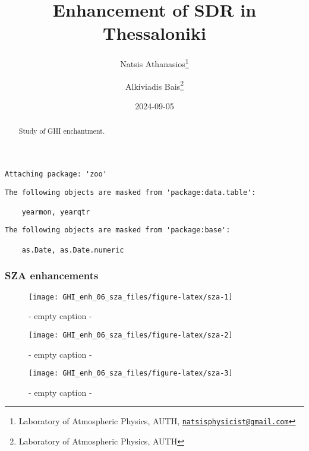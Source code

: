 \documentclass[
  10pt,
  a4paper,oneside]{article}
\title{Enhancement of SDR in Thessaloniki}
\author{Natsis Athanasios\footnote{Laboratory of Atmospheric Physics, AUTH, \href{mailto:natsisphysicist@gmail.com}{\nolinkurl{natsisphysicist@gmail.com}}} \and Alkiviadis Bais\footnote{Laboratory of Atmospheric Physics, AUTH}}
\date{2024-09-05}
\begin{document}
\maketitle
\begin{abstract}
Study of GHI enchantment.
\end{abstract}

{
\hypersetup{linkcolor=}
\setcounter{tocdepth}{4}
\tableofcontents
}
\begin{verbatim}
Attaching package: 'zoo'
\end{verbatim}

\begin{verbatim}
The following objects are masked from 'package:data.table':

    yearmon, yearqtr
\end{verbatim}

\begin{verbatim}
The following objects are masked from 'package:base':

    as.Date, as.Date.numeric
\end{verbatim}

\newpage
\FloatBarrier

\hypertarget{sza-enhancements}{%
\subsubsection{SZA enhancements}\label{sza-enhancements}}

\begin{figure}[H]

{\centering \texttt{[image: GHI\_enh\_06\_sza\_files/figure-latex/sza-1]} 

}

\caption{ - empty caption - }\label{fig:sza-1}
\end{figure}
\begin{figure}[H]

{\centering \texttt{[image: GHI\_enh\_06\_sza\_files/figure-latex/sza-2]} 

}

\caption{ - empty caption - }\label{fig:sza-2}
\end{figure}
\begin{figure}[H]

{\centering \texttt{[image: GHI\_enh\_06\_sza\_files/figure-latex/sza-3]} 

}

\caption{ - empty caption - }\label{fig:sza-3}
\end{figure}
\end{document}
